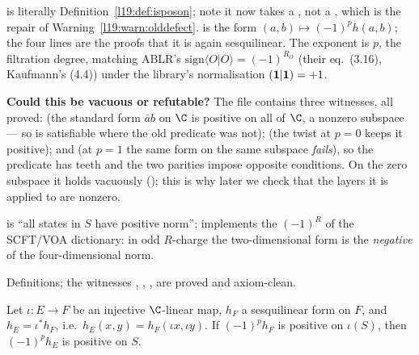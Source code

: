 \begin{dictionary}
 is literally Definition~\ref{l19:def:isposon}; note it now takes a
, not a , which is the repair of
Warning~\ref{l19:warn:olddefect}.  is the form $(a,b)\mapsto(-1)^ph(a,b)$; the
four  lines are the proofs that it is again sesquilinear. The exponent is $p$, the
filtration degree, matching ABLR's $\mathrm{sign}\langle O|O\rangle = (-1)^{R_O}$ (their eq.~(3.16),
Kaufmann's (4.4)) under the library's normalisation $(\mathbf{1}|\mathbf{1}) = +1$.

\textbf{Could this be vacuous or refutable?} The file contains three witnesses, all proved:
 (the standard form $\bar ab$ on $\C$ is positive on all of $\C$, a
nonzero subspace --- so  is satisfiable where the old predicate was not);
\allowbreak{}\allowbreak{}\allowbreak{} (the twist at $p=0$ keeps it positive); and
\allowbreak{}\allowbreak{}\allowbreak{}\allowbreak{} (at $p=1$ the same form on the same subspace \emph{fails}),
so the predicate has teeth and the two parities impose opposite conditions. On the zero subspace it
holds vacuously (); this is why later we check that the layers it is applied to are
nonzero.
\end{dictionary}

\begin{physics}
 is ``all states in $S$ have positive norm'';  implements the
$(-1)^R$ of the SCFT/VOA dictionary: in odd $R$-charge the two-dimensional form is the
\emph{negative} of the four-dimensional norm.
\end{physics}

\begin{status}
Definitions; the witnesses , \allowbreak{}\allowbreak{}\allowbreak{},
\allowbreak{}\allowbreak{}\allowbreak{}\allowbreak{},  are proved and axiom-clean.
\end{status}

\begin{theorem}\label{l19:thm:pullback}
Let $\iota:E\to F$ be an injective $\C$-linear map, $h_F$ a sesquilinear form on $F$, and
$h_E = \iota^*h_F$, i.e.\ $h_E(x,y) = h_F(\iota x,\iota y)$. If $(-1)^ph_F$ is positive on
$\iota(S)$, then $(-1)^ph_E$ is positive on $S$.
\end{theorem}

